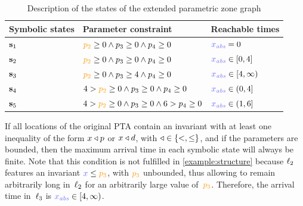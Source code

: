 \begin{tikzborder}{\cite{Gargantini16:validation}}
\begin{tikzborder}{\cite{gargantini_combinatorial_2017}}
\begin{tikzborder}{\cite{garn2019}}
\begin{tikzborder}{\cite{arcaini2019achieving}}
\begin{tikzborder}{\cite{arcaini2019varivolution}}
\begin{tikzborder}{}
\begin{example}
\begin{figure}[tb]
	\end{figure}
	
	\begin{table}[!htb]
		\caption{Description of the states of the extended parametric zone graph}
		\centering
		\begin{tabular}{l | l | l}
			\hline
			\rowHeader{} Symbolic states & Parameter constraint & Reachable times \\
			\hline
			$\mathbf{s}_1$ & $\parami{2} \geq 0 \land \param_3 \geq 0 \land \param_4 \geq 0 $ & $\clockabs = 0$ \\
			\hline
			$\mathbf{s}_2$ & $\parami{2} \geq 0 \land \param_3 \geq 0 \land \param_4 \geq 0 $ & $\clockabs \in [0, 4]$ \\
			\hline
			$\mathbf{s}_3$ & $\parami{2} \geq 0 \land \param_3 \geq 4 \land \param_4 \geq 0 $ & $\clockabs \in [4, \infty)$ \\
			\hline
			$\mathbf{s}_4$ & $4 > \parami{2} \geq 0 \land \param_3 \geq 0 \land \param_4 \geq 0 $ & $\clockabs \in (0, 4]$ \\
			\hline
			$\mathbf{s}_5$ & $4 > \parami{2} \geq 0 \land \param_3 \geq 0 \land 6 > \param_4 \geq 0 $ & $\clockabs \in (1, 6]$ \\
			\hline
		\end{tabular}
		\label{table:extended-PZG}
		
	\end{table}
\end{example}


\begin{remark}
	If all locations of the original PTA contain an invariant with at least one inequality of the form $x \triangleleft p$ or $x \triangleleft d$, with $\triangleleft \in \{ <, \leq \}$, and if the parameters are bounded, then the maximum arrival time in each symbolic state will always be finite.
	Note that this condition is not fulfilled in \ref{example:structure} because $\ell_2$ features an invariant $\styleclock{x} \leq \parami{3}$, with $\parami{3}$ unbounded, thus allowing to remain arbitrarily long in~$\ell_2$ for an arbitrarily large value of~$\parami{3}$.
	Therefore, the arrival time in~$\ell_3$ is $\clockabs \in [4, \infty)$.
\end{remark}

\end{tikzborder}


\end{tikzborder}
\end{tikzborder}
\end{tikzborder}
\end{tikzborder}
\end{tikzborder}

